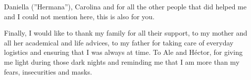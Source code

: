 Daniella (''Hermana''), Carolina and for all the other people that did helped me and I could not mention here, this is also for you.

Finally, I would like to thank my family for all their support, to my mother and all her academical and life advices, to my father for taking care of everyday logistics and ensuring that I was always at time. To Ale and Héctor, for giving me light during those dark nights and reminding me that I am more than my fears, insecurities and masks.

